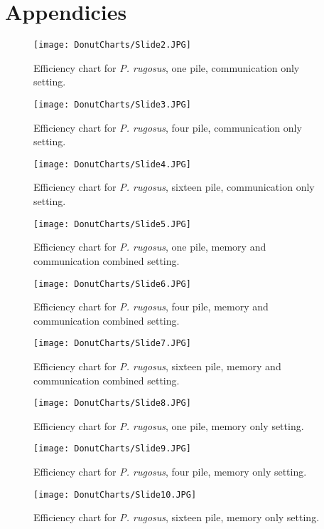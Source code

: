 \chapter{Appendicies}
\begin{figure}[h]
	\texttt{[image: DonutCharts/Slide2.JPG]}
	\caption{Efficiency chart for \textit{P. rugosus}, one pile,  communication only setting.}
\end{figure}
\begin{figure}[h]
	\texttt{[image: DonutCharts/Slide3.JPG]}
\caption{Efficiency chart for \textit{P. rugosus}, four pile,  communication only setting.}
\end{figure}
\begin{figure}[h]
	\texttt{[image: DonutCharts/Slide4.JPG]}
	\caption{Efficiency chart for \textit{P. rugosus}, sixteen pile,  communication only setting.}
\end{figure}
\begin{figure}[h]
	\texttt{[image: DonutCharts/Slide5.JPG]}
	\caption{Efficiency chart for \textit{P. rugosus}, one pile,  memory and communication combined setting.}
\end{figure}
\begin{figure}[h]
	\texttt{[image: DonutCharts/Slide6.JPG]}
	\caption{Efficiency chart for \textit{P. rugosus}, four pile, memory and communication combined setting.}
\end{figure}
\begin{figure}[h]
	\texttt{[image: DonutCharts/Slide7.JPG]}
	\caption{Efficiency chart for \textit{P. rugosus}, sixteen pile,  memory and communication combined setting.}
\end{figure}
\begin{figure}[h]
	\texttt{[image: DonutCharts/Slide8.JPG]}
	\caption{Efficiency chart for \textit{P. rugosus}, one pile,  memory only setting.}
\end{figure}
\begin{figure}[h]
	\texttt{[image: DonutCharts/Slide9.JPG]}
	\caption{Efficiency chart for \textit{P. rugosus}, four pile,  memory only setting.}
\end{figure}
\begin{figure}[h]
	\texttt{[image: DonutCharts/Slide10.JPG]}
	\caption{Efficiency chart for \textit{P. rugosus}, sixteen pile,  memory only setting.}
\end{figure}
